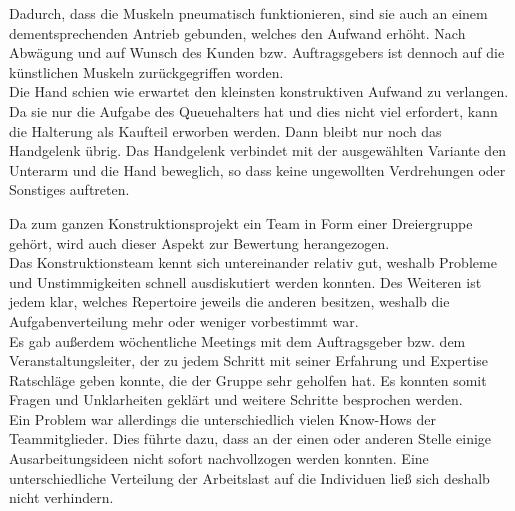 	Dadurch, dass die Muskeln pneumatisch funktionieren, sind sie auch an einem dementsprechenden Antrieb gebunden, welches den Aufwand erhöht.
	Nach Abwägung und auf Wunsch des Kunden bzw. Auftragsgebers ist dennoch auf die künstlichen Muskeln zurückgegriffen worden.\\
	Die Hand schien wie erwartet den kleinsten konstruktiven Aufwand zu verlangen.
	Da sie nur die Aufgabe des Queuehalters hat und dies nicht viel erfordert, kann die Halterung als Kaufteil erworben werden.
	Dann bleibt nur noch das Handgelenk übrig.
	Das Handgelenk verbindet mit der ausgewählten Variante den Unterarm und die Hand beweglich, so dass keine ungewollten Verdrehungen oder Sonstiges auftreten.\par \medskip
	Da zum ganzen Konstruktionsprojekt ein Team in Form einer Dreiergruppe gehört, wird auch dieser Aspekt zur Bewertung herangezogen.\\
	Das Konstruktionsteam kennt sich untereinander relativ gut, weshalb Probleme und Unstimmigkeiten schnell ausdiskutiert werden konnten.
	Des Weiteren ist jedem klar, welches Repertoire jeweils die anderen besitzen, weshalb die Aufgabenverteilung mehr oder weniger vorbestimmt war.\\
	Es gab außerdem wöchentliche Meetings mit dem Auftragsgeber bzw. dem Veranstaltungsleiter, der zu jedem Schritt mit seiner Erfahrung und Expertise Ratschläge geben konnte, die der Gruppe sehr geholfen hat.
	Es konnten somit Fragen und Unklarheiten geklärt und weitere Schritte besprochen werden.\\
	Ein Problem war allerdings die unterschiedlich vielen Know-Hows der Teammitglieder.
	Dies führte dazu, dass an der einen oder anderen Stelle einige Ausarbeitungsideen nicht sofort nachvollzogen werden konnten.
	Eine unterschiedliche Verteilung der Arbeitslast auf die Individuen ließ sich deshalb nicht verhindern.